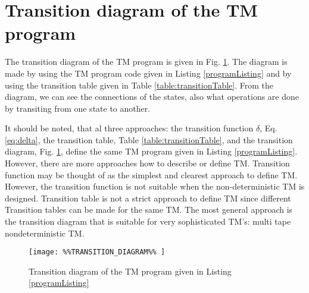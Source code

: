 \documentclass[12pt, a4paper]{report}
\begin{document}
{%
\begin{table}[h]
	\caption{Transition table of the Turing machine program given in Listing \ref{programListing}} \label{table:transitionTable}
	\centering
\end{table}

\section{Transition diagram of the TM program}
	The transition diagram of the TM program is given in Fig. \ref{transitionDiagram}. The diagram is made by using the TM program code given in Listing \ref{programListing} and by using the transition table given in Table \ref{table:transitionTable}. From the diagram, we can see the connections of the states, also what operations are done by transiting from one state to another.
	
	It should be noted, that al three approaches: the transition function $ \delta $, Eq. \eqref{eq:delta}, the transition table, Table \ref{table:transitionTable}, and the transition diagram, Fig. \ref{transitionDiagram}, define the same TM program given in Listing \ref{programListing}. However, there are more approaches how to describe or define TM. Transition function may be thought of as the simplest and clearest approach to define TM. However, the transition function is not suitable when the non-deterministic TM is designed. Transition table is not a strict approach to define TM since different Transition tables can be made for the same TM. The most general approach is the transition diagram that is suitable for very sophisticated TM's: multi tape nondeterministic TM.


\enlargethispage{100cm}
\begin{figure}
	\centering

	\texttt{[image: 
	\%\%TRANSITION\_DIAGRAM\%\%
	]}

	\caption{Transition diagram of the TM program given in Listing \ref{programListing}} \label{transitionDiagram}
\end{figure}



}
\end{document}
